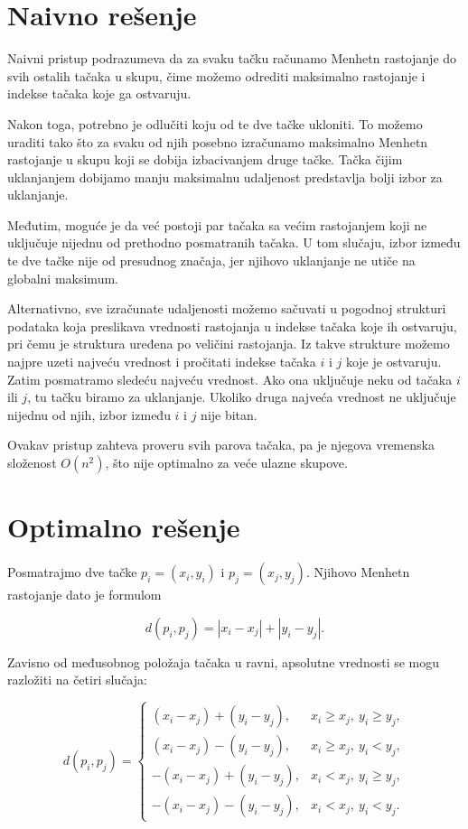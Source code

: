 \documentclass{article}
\begin{document}
\medskip

\section{Naivno rešenje}


Naivni pristup podrazumeva da za svaku tačku računamo Menhetn rastojanje do svih ostalih tačaka u skupu, čime možemo odrediti maksimalno rastojanje i indekse tačaka koje ga ostvaruju.

Nakon toga, potrebno je odlučiti koju od te dve tačke ukloniti. To možemo uraditi tako što za svaku od njih posebno izračunamo maksimalno Menhetn rastojanje u skupu koji se dobija izbacivanjem druge tačke.
Tačka čijim uklanjanjem dobijamo manju maksimalnu udaljenost predstavlja bolji izbor za uklanjanje.

Međutim, moguće je da već postoji par tačaka sa većim rastojanjem koji ne uključuje nijednu od prethodno posmatranih tačaka. U tom slučaju, izbor između te dve tačke nije od presudnog značaja, jer njihovo uklanjanje ne utiče na globalni maksimum.

Alternativno, sve izračunate udaljenosti možemo sačuvati u pogodnoj strukturi podataka koja preslikava vrednosti rastojanja u indekse tačaka koje ih ostvaruju, pri čemu je struktura uređena po veličini rastojanja.
Iz takve strukture možemo najpre uzeti najveću vrednost i pročitati indekse tačaka $i$ i $j$ koje je ostvaruju. Zatim posmatramo sledeću najveću vrednost. Ako ona uključuje neku od tačaka $i$ ili $j$, tu tačku biramo za uklanjanje. Ukoliko druga najveća vrednost ne uključuje nijednu od njih, izbor između $i$ i $j$ nije bitan.

Ovakav pristup zahteva proveru svih parova tačaka, pa je njegova vremenska složenost $O(n^2)$, što nije optimalno za veće ulazne skupove.

\section{Optimalno rešenje}

Posmatrajmo dve tačke $p_i = (x_i, y_i)$ i $p_j = (x_j, y_j)$.
Njihovo Menhetn rastojanje dato je formulom

\[
d(p_i,p_j) = |x_i - x_j| + |y_i - y_j|.
\]

Zavisno od međusobnog položaja tačaka u ravni, apsolutne vrednosti se mogu razložiti na četiri slučaja:

\[
d(p_i,p_j) =
\begin{cases}
(x_i - x_j) + (y_i - y_j), & x_i \ge x_j,\ y_i \ge y_j, \\
(x_i - x_j) - (y_i - y_j), & x_i \ge x_j,\ y_i < y_j, \\
-(x_i - x_j) + (y_i - y_j), & x_i < x_j,\ y_i \ge y_j, \\
-(x_i - x_j) - (y_i - y_j), & x_i < x_j,\ y_i < y_j.
\end{cases}
\]
\end{document}
